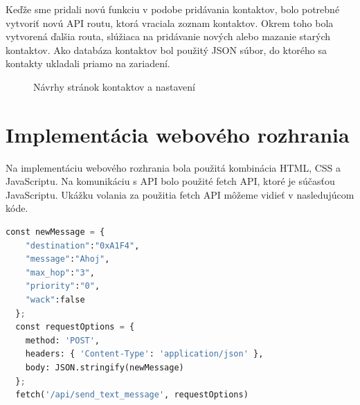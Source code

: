 \documentclass[slovak,master]{diploma}
\begin{document}
Keďže sme pridali novú funkciu v podobe pridávania kontaktov, bolo potrebné vytvoriť novú API routu, ktorá vraciala 
zoznam kontaktov. Okrem toho bola vytvorená ďalšia routa, slúžiaca na pridávanie nových alebo mazanie starých kontaktov. 
Ako databáza kontaktov bol použitý JSON súbor, do ktorého sa kontakty ukladali priamo na zariadení.

\begin{figure}[h!]
  \centering
  \qquad
  \caption{Návrhy stránok kontaktov a nastavení}
  \label{fig:figma2}
\end{figure}

\section{Implementácia webového rozhrania}
Na implementáciu webového rozhrania bola použitá kombinácia HTML, CSS a JavaScriptu. Na komunikáciu s API bolo použité fetch API, 
ktoré je súčasťou JavaScriptu. Ukážku volania za použitia fetch API môžeme vidieť v nasledujúcom kóde.

\begin{lstlisting}[language=Python, label={lst:fetch}]
  const newMessage = {
    "destination":"0xA1F4",
    "message":"Ahoj",
    "max_hop":"3",
    "priority":"0",
    "wack":false
  };
  const requestOptions = {
    method: 'POST',
    headers: { 'Content-Type': 'application/json' },
    body: JSON.stringify(newMessage)
  };
  fetch('/api/send_text_message', requestOptions)
\end{lstlisting}
\end{document}
